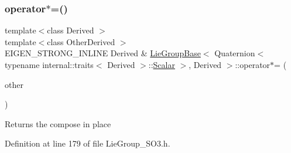 \subsubsection{\texorpdfstring{operator$\ast$=()}{operator*=()}}
{\footnotesize\ttfamily template$<$class Derived $>$ \\
template$<$class Other\+Derived $>$ \\
E\+I\+G\+E\+N\+\_\+\+S\+T\+R\+O\+N\+G\+\_\+\+I\+N\+L\+I\+NE Derived \& \hyperlink{class_lie_group_base}{Lie\+Group\+Base}$<$ Quaternion$<$ typename internal\+::traits$<$ Derived $>$\+::\hyperlink{class_lie_group_base_3_01_quaternion_3_01typename_01internal_1_1traits_3_01_derived_01_4_1_1_scalar_01_4_00_01_derived_01_4_afadeceb3b98e52deecc572e71efb82a8}{Scalar} $>$, Derived $>$\+::operator$\ast$= (\begin{DoxyParamCaption}\item[{const \hyperlink{class_lie_group_base}{Lie\+Group\+Base}$<$ \hyperlink{class_lie_group_base_3_01_quaternion_3_01typename_01internal_1_1traits_3_01_derived_01_4_1_1_scalar_01_4_00_01_derived_01_4_a1a65624391a6a8eb63eb312f919c4855}{Base\+Type}, Other\+Derived $>$ \&}]{other }\end{DoxyParamCaption})}

\begin{DoxyReturn}{Returns}
the compose in place 
\end{DoxyReturn}


Definition at line 179 of file Lie\+Group\+\_\+\+S\+O3.\+h.

\hypertarget{class_lie_group_base_3_01_quaternion_3_01typename_01internal_1_1traits_3_01_derived_01_4_1_1_scalar_01_4_00_01_derived_01_4_a7dca1ee83a331d3743ca3f66b187528f}{}\label{class_lie_group_base_3_01_quaternion_3_01typename_01internal_1_1traits_3_01_derived_01_4_1_1_scalar_01_4_00_01_derived_01_4_a7dca1ee83a331d3743ca3f66b187528f} 
